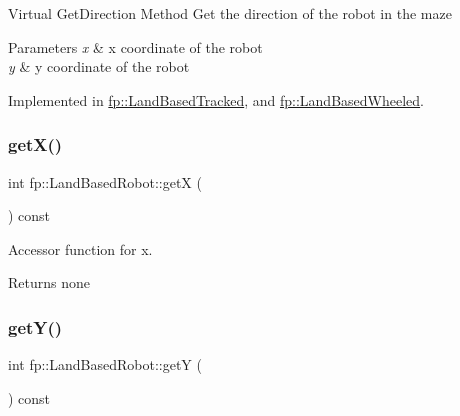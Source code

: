 Virtual Get\+Direction Method Get the direction of the robot in the maze 
\begin{DoxyParams}{Parameters}
{\em x} & x coordinate of the robot \\
\hline
{\em y} & y coordinate of the robot \\
\hline
\end{DoxyParams}


Implemented in \hyperlink{classfp_1_1_land_based_tracked_a3e6ba37a5c5bf8f2b4abb19907e5e9b8}{fp\+::\+Land\+Based\+Tracked}, and \hyperlink{classfp_1_1_land_based_wheeled_adaafaceb388374ffb9cec28301665492}{fp\+::\+Land\+Based\+Wheeled}.

\mbox{\label{classfp_1_1_land_based_robot_aff91a5c22ba358b888fa4939930248ce}} 
\subsubsection{\texorpdfstring{get\+X()}{getX()}}
{\footnotesize\ttfamily int fp\+::\+Land\+Based\+Robot\+::getX (\begin{DoxyParamCaption}{ }\end{DoxyParamCaption}) const\hspace{0.3cm}{\ttfamily [inline]}}



Accessor function for x. 

\begin{DoxyReturn}{Returns}
none 
\end{DoxyReturn}
\mbox{\label{classfp_1_1_land_based_robot_ac2f55928ef37240afda0773e15ad5b17}} 
\subsubsection{\texorpdfstring{get\+Y()}{getY()}}
{\footnotesize\ttfamily int fp\+::\+Land\+Based\+Robot\+::getY (\begin{DoxyParamCaption}{ }\end{DoxyParamCaption}) const\hspace{0.3cm}{\ttfamily [inline]}}



